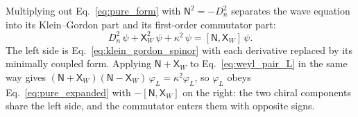 \documentclass[aps,prd,onecolumn,tightenlines,nofootinbib,notitlepage,11pt,floatfix]{revtex4-2}
\theoremstyle{indentedtheorem}
\begin{document}
Multiplying out Eq.~\eqref{eq:pure_form} with $\mathsf{N}^2=-D_n^2$ separates the wave equation into its Klein--Gordon part and its first-order commutator part:
\begin{equation}
    D_n^2\,\psi + \mathsf{X}_W^2\,\psi + \kappa^2\,\psi = [\mathsf{N},\mathsf{X}_W]\,\psi .
    \label{eq:pure_expanded}
\end{equation}
The left side is Eq.~\eqref{eq:klein_gordon_spinor} with each derivative replaced by its minimally coupled form. Applying $\mathsf{N}+\mathsf{X}_W$ to Eq.~\eqref{eq:weyl_pair_L} in the same way gives $(\mathsf{N}+\mathsf{X}_W)(\mathsf{N}-\mathsf{X}_W)\,\varphi_L=\kappa^2\varphi_L$, so $\varphi_L$ obeys Eq.~\eqref{eq:pure_expanded} with $-[\mathsf{N},\mathsf{X}_W]$ on the right: the two chiral components share the left side, and the commutator enters them with opposite signs.
\end{document}

